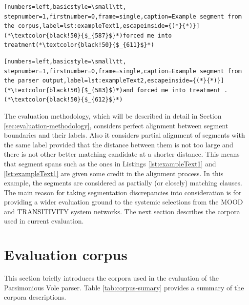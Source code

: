 \noindent
\begin{minipage}{\linewidth}
\begin{lstlisting}[numbers=left,basicstyle=\small\tt, stepnumber=1,firstnumber=0,frame=single,caption=Example segment from the corpus,label=lst:exampleText1,escapeinside={(*}{*)}]
(*\textcolor{black!50}{$_{587}$}*)forced me into treatment(*\textcolor{black!50}{$_{611}$}*)
\end{lstlisting}
\end{minipage}

\noindent
\begin{minipage}{\linewidth}
\begin{lstlisting}[numbers=left,basicstyle=\small\tt, stepnumber=1,firstnumber=0,frame=single,caption=Example segment from the parser output,label=lst:exampleText2,escapeinside={(*}{*)}]
(*\textcolor{black!50}{$_{583}$}*)and forced me into treatment .(*\textcolor{black!50}{$_{612}$}*)
\end{lstlisting}
\end{minipage}    

The evaluation methodology, which will be described in detail in Section \ref{sec:evaluation-methodology}, considers perfect alignment between segment boundaries and their labels. Also it considers partial alignment of segments with the same label provided that the distance between them is not too large and there is not other better matching candidate at a shorter distance. This means that segment spans such as the ones in Listings \ref{lst:exampleText1} and \ref{lst:exampleText1} are given some credit in the alignment process. In this example, the segments are considered as partially (or closely) matching clauses. The main reason for taking segmentation discrepancies into consideration is for providing a wider evaluation ground to the systemic selections from the MOOD and TRANSITIVITY system networks. The next section describes the corpora used in current evaluation. 

\section{Evaluation corpus}
\label{sec:corpus}
    
    This section briefly introduces the corpora used in the evaluation of the Parsimonious Vole parser. Table \ref{tab:corpus-sumary} provides a summary of the corpora descriptions.  
    
